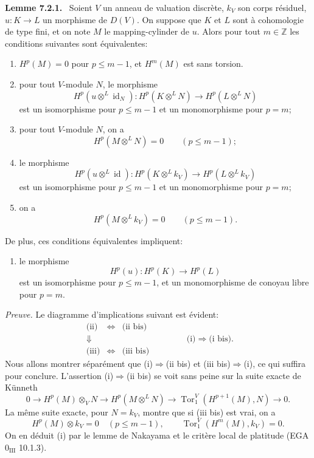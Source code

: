 \documentclass[11pt]{article}
\newenvironment{statement}[1]{\par\medskip\noindent\textbf{#1.}\ }{\par\medskip}
\begin{document}
\begin{statement}{Lemme 7.2.1}
Soient $V$ un anneau de valuation discrète, $k_V$ son corps résiduel, $u:K\to L$ un morphisme de $D(V)$. On suppose que $K$ et $L$ sont à cohomologie de type fini, et on note $M$ le mapping-cylinder de $u$. Alors pour tout $m\in\mathbb Z$ les conditions suivantes sont équivalentes:
\begin{enumerate}[label=(\roman*)]
\item $H^p(M)=0$ pour $p\le m-1$, et $H^m(M)$ est sans torsion.
\item pour tout $V$-module $N$, le morphisme
\[
H^p(u\otimes^L\operatorname{id}_N):H^p(K\otimes^L N)\to H^p(L\otimes^L N)
\]
est un isomorphisme pour $p\le m-1$ et un monomorphisme pour $p=m$;
\item[(ii bis)] pour tout $V$-module $N$, on a
\[
H^p(M\otimes^L N)=0\qquad(p\le m-1);
\]
\item le morphisme
\[
H^p(u\otimes^L\operatorname{id}):H^p(K\otimes^L k_V)\to H^p(L\otimes^L k_V)
\]
est un isomorphisme pour $p\le m-1$ et un monomorphisme pour $p=m$;
\item[(iii bis)] on a
\[
H^p(M\otimes^L k_V)=0\qquad(p\le m-1).
\]
\end{enumerate}
De plus, ces conditions équivalentes impliquent:
\begin{enumerate}[label=(\roman* bis)]
\item le morphisme
\[
H^p(u):H^p(K)\to H^p(L)
\]
est un isomorphisme pour $p\le m-1$, et un monomorphisme de conoyau libre pour $p=m$.
\end{enumerate}
\end{statement}

\emph{Preuve.} Le diagramme d'implications suivant est évident:
\[
\begin{array}{ccc}
\text{(ii)}&\Leftrightarrow&\text{(ii bis)}\\
\Downarrow&&\\
\text{(iii)}&\Leftrightarrow&\text{(iii bis)}
\end{array}
\qquad\qquad
\text{(i)}\Rightarrow\text{(i bis).}
\]
Nous allons montrer séparément que (i)$\Rightarrow$(ii bis) et (iii bis)$\Rightarrow$(i), ce qui suffira pour conclure. L'assertion (i)$\Rightarrow$(ii bis) se voit sans peine sur la suite exacte de Künneth
\[
0\to H^p(M)\otimes_V N\to H^p(M\otimes^L N)\to \operatorname{Tor}_1^V(H^{p+1}(M),N)\to0.
\]
La même suite exacte, pour $N=k_V$, montre que si (iii bis) est vrai, on a
\[
H^p(M)\otimes k_V=0\quad(p\le m-1),\qquad
\operatorname{Tor}_1^V(H^m(M),k_V)=0.
\]
On en déduit (i) par le lemme de Nakayama et le critère local de platitude (EGA $0_{\mathrm{III}}$ 10.1.3).
\end{document}
